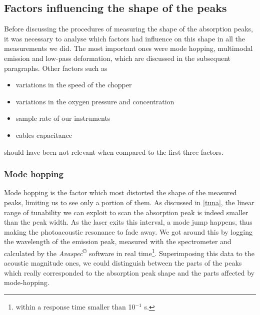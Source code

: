 \subsection{Factors influencing the shape of the peaks}\label{factorshape}
Before discussing the procedures of measuring the shape of the absorption peaks, it was necessary to analyse which factors had influence on this shape in all the measurements we did. The most important ones were mode hopping, multimodal emission and low-pass deformation, which are discussed in the subsequent paragraphs. Other factors such as
\begin{itemize}
\item variations in the speed of the chopper
\item variations in the oxygen pressure and concentration
\item sample rate of our instruments
\item cables capacitance 
\end{itemize}
should have been not relevant when compared to the first three factors.

\subsubsection{Mode hopping} 
Mode hopping is the factor which most distorted the shape of the measured peaks, limiting us to see only a portion of them. As discussed in \cref{tuna}, the linear range of tunability we can exploit to scan the absorption peak is indeed smaller than the peak width. As the laser exits this interval, a mode jump happens, thus making the photoacoustic resonance to fade away. We got around this by logging the wavelength of the emission peak, measured with the spectrometer and calculated by the \textit{Avaspec}\textsuperscript{\copyright} software in real time\footnote{within a response time smaller than 10$^{-1}$ s.}. Superimposing this data to the acoustic magnitude ones, we could distinguish between the parts of the peaks which really corresponded to the absorption peak shape and the parts affected by mode-hopping.

